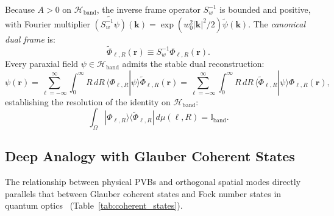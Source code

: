 \documentclass[11pt,a4paper]{article}
\begin{document}
Because $A > 0$ on $\mathcal{H}_{\text{band}}$, the inverse frame operator $S_w^{-1}$ is bounded and positive, with Fourier multiplier $\widetilde{(S_w^{-1} \psi)}(\mathbf{k}) = \exp(w_0^2 |\mathbf{k}|^2 / 2) \widetilde{\psi}(\mathbf{k})$. The \emph{canonical dual frame} is:
\begin{equation}
\widetilde{\Phi}_{\ell, R}(\mathbf{r}) \equiv S_w^{-1} \Phi_{\ell, R}(\mathbf{r}).
\label{eq:canonical_dual_def}
\end{equation}
Every paraxial field $\psi \in \mathcal{H}_{\text{band}}$ admits the stable dual reconstruction:
\begin{equation}
\boxed{\psi(\mathbf{r}) = \sum_{\ell=-\infty}^\infty \int_0^\infty R \, dR \, \langle \Phi_{\ell, R} | \psi \rangle \widetilde{\Phi}_{\ell, R}(\mathbf{r}) = \sum_{\ell=-\infty}^\infty \int_0^\infty R \, dR \, \langle \widetilde{\Phi}_{\ell, R} | \psi \rangle \Phi_{\ell, R}(\mathbf{r}),}
\label{eq:dual_expansion}
\end{equation}
establishing the resolution of the identity on $\mathcal{H}_{\text{band}}$:
\begin{equation}
\int_\Omega |\Phi_{\ell, R}\rangle \langle \widetilde{\Phi}_{\ell, R}| \, d\mu(\ell, R) = \mathbb{I}_{\text{band}}.
\label{eq:resolution_identity}
\end{equation}

\subsection{Deep Analogy with Glauber Coherent States}

The relationship between physical PVBs and orthogonal spatial modes directly parallels that between Glauber coherent states and Fock number states in quantum optics~\cite{Klauder1985,Perelomov1986} (Table~\ref{tab:coherent_states}).
\end{document}
